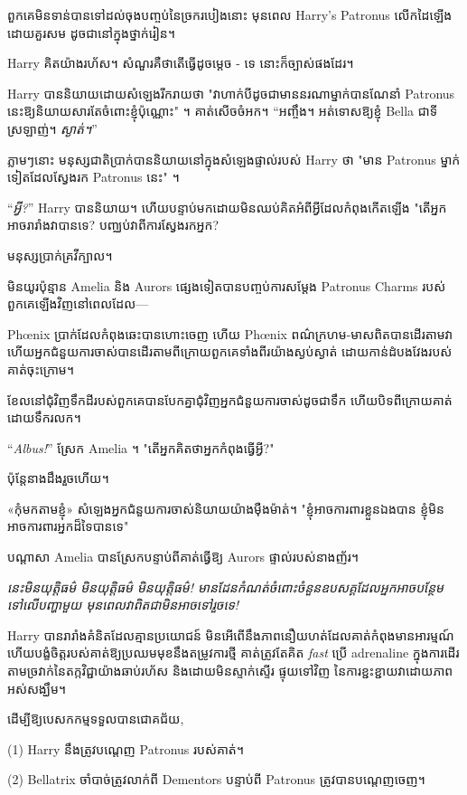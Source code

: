 \later

ពួកគេមិនទាន់បានទៅដល់ចុងបញ្ចប់នៃច្រករបៀងនោះ មុនពេល Harry's Patronus លើកដៃឡើងដោយគួរសម ដូចជានៅក្នុងថ្នាក់រៀន។

Harry គិតយ៉ាងរហ័ស។ សំណួរគឺថាតើធ្វើដូចម្តេច - ទេ នោះក៏ច្បាស់ផងដែរ។

Harry បាននិយាយដោយសំឡេងរីករាយថា "វាហាក់បីដូចជាមាននរណាម្នាក់បានណែនាំ Patronus នេះឱ្យនិយាយសារតែចំពោះខ្ញុំប៉ុណ្ណោះ" ។ គាត់សើចចំអក។ “អញ្ចឹង។ អត់ទោសឱ្យខ្ញុំ Bella ជាទីស្រឡាញ់។ \emph{ស្ងាត់។}”

ភ្លាមៗនោះ មនុស្សជាតិប្រាក់បាននិយាយនៅក្នុងសំឡេងផ្ទាល់របស់ Harry ថា "មាន Patronus ម្នាក់ទៀតដែលស្វែងរក Patronus នេះ" ។

“\emph{អ្វី?}” Harry បាននិយាយ។ ហើយបន្ទាប់មកដោយមិនឈប់គិតអំពីអ្វីដែលកំពុងកើតឡើង "តើអ្នកអាចរារាំងវាបានទេ? បញ្ឈប់វាពីការស្វែងរកអ្នក?

មនុស្ស​ប្រាក់​គ្រវីក្បាល។

\later

មិនយូរប៉ុន្មាន Amelia និង Aurors ផ្សេងទៀតបានបញ្ចប់ការសម្ដែង Patronus Charms របស់ពួកគេឡើងវិញនៅពេលដែល—

Phœnix ប្រាក់ដែលកំពុងឆេះបានហោះចេញ ហើយ Phœnix ពណ៌ក្រហម-មាសពិតបានដើរតាមវា ហើយអ្នកជំនួយការចាស់បានដើរតាមពីក្រោយពួកគេទាំងពីរយ៉ាងស្ងប់ស្ងាត់ ដោយកាន់ដំបងវែងរបស់គាត់ចុះក្រោម។

ខែលនៅជុំវិញទឹកដីរបស់ពួកគេបានបែកគ្នាជុំវិញអ្នកជំនួយការចាស់ដូចជាទឹក ហើយបិទពីក្រោយគាត់ដោយទឹករលក។

“\emph{Albus!}” ស្រែក Amelia ។ "តើអ្នកគិតថាអ្នកកំពុងធ្វើអ្វី?"

ប៉ុន្តែនាងដឹងរួចហើយ។

«កុំមកតាមខ្ញុំ» សំឡេងអ្នកជំនួយការចាស់និយាយយ៉ាងម៉ឺងម៉ាត់។ "ខ្ញុំអាចការពារខ្លួនឯងបាន ខ្ញុំមិនអាចការពារអ្នកដ៏ទៃបានទេ"

បណ្តាសា Amelia បានស្រែកបន្ទាប់ពីគាត់ធ្វើឱ្យ Aurors ផ្ទាល់របស់នាងញ័រ។

\later

\emph{នេះមិនយុត្តិធម៌ មិនយុត្តិធម៌ មិនយុត្តិធម៌! មានដែនកំណត់ចំពោះចំនួនឧបសគ្គដែលអ្នកអាចបន្ថែមទៅលើបញ្ហាមួយ មុនពេលវាពិតជាមិនអាចទៅរួចទេ!}

Harry បានរារាំងគំនិតដែលគ្មានប្រយោជន៍ មិនអើពើនឹងភាពនឿយហត់ដែលគាត់កំពុងមានអារម្មណ៍ ហើយបង្ខំចិត្តរបស់គាត់ឱ្យប្រឈមមុខនឹងតម្រូវការថ្មី គាត់ត្រូវតែគិត \emph{fast} ប្រើ adrenaline ក្នុងការដើរតាមច្រវាក់នៃតក្កវិជ្ជាយ៉ាងឆាប់រហ័ស និងដោយមិនស្ទាក់ស្ទើរ ផ្ទុយទៅវិញ នៃការខ្ជះខ្ជាយវាដោយភាពអស់សង្ឃឹម។

ដើម្បីឱ្យបេសកកម្មទទួលបានជោគជ័យ,

(1) Harry នឹងត្រូវបណ្តេញ Patronus របស់គាត់។

(2) Bellatrix ចាំបាច់ត្រូវលាក់ពី Dementors បន្ទាប់ពី Patronus ត្រូវបានបណ្តេញចេញ។

